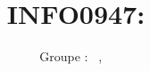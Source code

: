 \documentclass[a4paper, 11pt, oneside]{article}
\title{INFO0947: \intitule}
\author{Groupe \GrNbr : \PrenomUN~\textsc{\NomUN}, \PrenomDEUX~\textsc{\NomDEUX}}
\date{}
\newcommand{\tablemat}{\tableofcontents}
\begin{document}
\maketitle
\newpage
\tablemat
\newpage





















\end{document}

